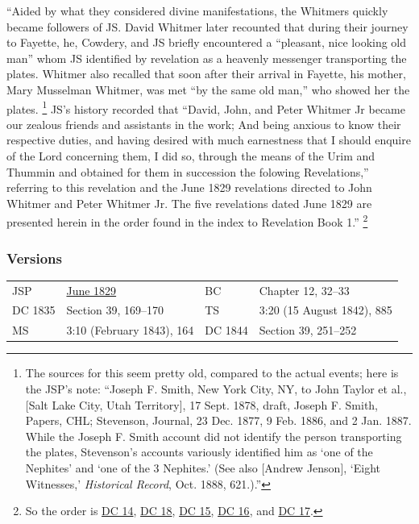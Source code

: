 			``Aided by what they considered divine manifestations, the Whitmers quickly became followers of JS. David Whitmer later recounted that during their journey to Fayette, he, Cowdery, and JS briefly encountered a ``pleasant, nice looking old man'' whom JS identified by revelation as a heavenly messenger transporting the plates. Whitmer also recalled that soon after their arrival in Fayette, his mother, Mary Musselman Whitmer, was met ``by the same old man,'' who showed her the plates.%
				\footnote{%
					The sources for this seem pretty old, compared to the actual events; here is the JSP's note: ``Joseph F. Smith, New York City, NY, to John Taylor et al., [Salt Lake City, Utah Territory], 17 Sept. 1878, draft, Joseph F. Smith, Papers, CHL; Stevenson, Journal, 23 Dec. 1877, 9 Feb. 1886, and 2 Jan. 1887. While the Joseph F. Smith account did not identify the person transporting the plates, Stevenson's accounts variously identified him as `one of the Nephites' and `one of the 3 Nephites.' (See also [Andrew Jenson], `Eight Witnesses,' \textit{Historical Record}, Oct. 1888, 621.).''
					}
			JS's history recorded that ``David, John, and Peter Whitmer Jr became our zealous friends and assistants in the work; And being anxious to know their respective duties, and having desired with much earnestness that I should enquire of the Lord concerning them, I did so, through the means of the Urim and Thummin and obtained for them in succession the folowing Revelations,'' referring to this revelation and the June 1829 revelations directed to John Whitmer and Peter Whitmer Jr. The five revelations dated June 1829 are presented herein in the order found in the index to Revelation Book 1.''%
				\footnote{%
					So the order is \hyperref[DC14]{DC 14}, \hyperref[DC18]{DC 18}, \hyperref[DC15]{DC 15}, \hyperref[DC16]{DC 16}, and \hyperref[DC17]{DC 17}.
					}
			
	\subsubsection{Versions}
		\label{DC14-V}
	
		\begin{tabular}{p{1in}p{2in}p{1in}p{2in}}
			JSP		& \hyperref[EMS-1828-1829-JS-JUN-1829-A]{June 1829}		& BC & Chapter 12, 32--33 \\
			DC 1835	& Section 39, 169--170									& TS & 3:20 (15 August 1842), 885 \\
			MS		& 3:10 (February 1843), 164								& DC 1844 & Section 39, 251--252 \\
		\end{tabular}
		
